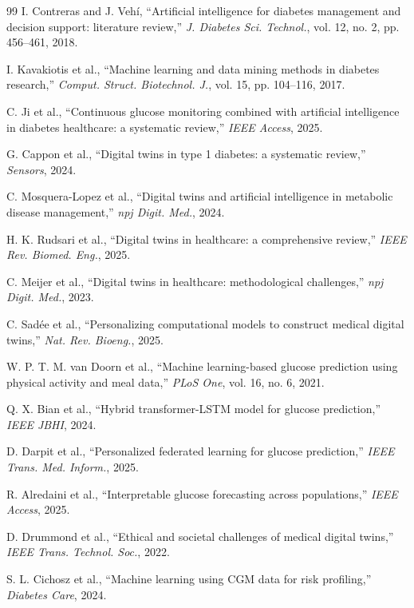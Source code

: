 \documentclass[journal]{IEEEtran}
\begin{document}
\begin{thebibliography}{99}
I. Contreras and J. Vehí, “Artificial intelligence for diabetes management and decision support: literature review,” \textit{J. Diabetes Sci. Technol.}, vol. 12, no. 2, pp. 456--461, 2018.

I. Kavakiotis et al., “Machine learning and data mining methods in diabetes research,” \textit{Comput. Struct. Biotechnol. J.}, vol. 15, pp. 104--116, 2017.

C. Ji et al., “Continuous glucose monitoring combined with artificial intelligence in diabetes healthcare: a systematic review,” \textit{IEEE Access}, 2025.

G. Cappon et al., “Digital twins in type 1 diabetes: a systematic review,” \textit{Sensors}, 2024.

C. Mosquera-Lopez et al., “Digital twins and artificial intelligence in metabolic disease management,” \textit{npj Digit. Med.}, 2024.

H. K. Rudsari et al., “Digital twins in healthcare: a comprehensive review,” \textit{IEEE Rev. Biomed. Eng.}, 2025.

C. Meijer et al., “Digital twins in healthcare: methodological challenges,” \textit{npj Digit. Med.}, 2023.

C. Sadée et al., “Personalizing computational models to construct medical digital twins,” \textit{Nat. Rev. Bioeng.}, 2025.

W. P. T. M. van Doorn et al., “Machine learning-based glucose prediction using physical activity and meal data,” \textit{PLoS One}, vol. 16, no. 6, 2021.

Q. X. Bian et al., “Hybrid transformer-LSTM model for glucose prediction,” \textit{IEEE JBHI}, 2024.

D. Darpit et al., “Personalized federated learning for glucose prediction,” \textit{IEEE Trans. Med. Inform.}, 2025.

R. Alredaini et al., “Interpretable glucose forecasting across populations,” \textit{IEEE Access}, 2025.

D. Drummond et al., “Ethical and societal challenges of medical digital twins,” \textit{IEEE Trans. Technol. Soc.}, 2022.

S. L. Cichosz et al., “Machine learning using CGM data for risk profiling,” \textit{Diabetes Care}, 2024.


\end{thebibliography}
\end{document}

